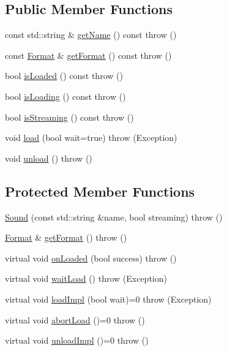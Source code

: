 \subsection*{Public Member Functions}
\begin{DoxyCompactItemize}
\item 
const std\+::string \& \hyperlink{classAudio_1_1Sound_abe908f4a8daa3bed34ae83d42b88995a}{get\+Name} () const   throw ()
\item 
const \hyperlink{structAudio_1_1Format}{Format} \& \hyperlink{classAudio_1_1Sound_a714c747a526cbbbd173d08e646761c4c}{get\+Format} () const   throw ()
\item 
bool \hyperlink{classAudio_1_1Sound_aedf1e75aa5941f03832b1311409f3207}{is\+Loaded} () const   throw ()
\item 
bool \hyperlink{classAudio_1_1Sound_af0eb3f71210b9edbc68dbb6dbd6c5ffa}{is\+Loading} () const   throw ()
\item 
bool \hyperlink{classAudio_1_1Sound_a1ab35988befedcd4946381f4fa34b4aa}{is\+Streaming} () const   throw ()
\item 
void \hyperlink{classAudio_1_1Sound_a916b66e6374afd61e5bef2963e8c6def}{load} (bool wait=true)  throw (\+Exception)
\item 
void \hyperlink{classAudio_1_1Sound_a949ed40b63466d4117766c2f7997a4cc}{unload} ()  throw ()
\end{DoxyCompactItemize}
\subsection*{Protected Member Functions}
\begin{DoxyCompactItemize}
\item 
\hyperlink{classAudio_1_1Sound_a8afa9a6f45a6bad39739b7c921e6ad3b}{Sound} (const std\+::string \&name, bool streaming)  throw ()
\item 
\hyperlink{structAudio_1_1Format}{Format} \& \hyperlink{classAudio_1_1Sound_a12781c8edb68b81c233940e8b1512bd1}{get\+Format} ()  throw ()
\item 
virtual void \hyperlink{classAudio_1_1Sound_ae6b55d6b14f5706c3f11fa70878b960e}{on\+Loaded} (bool success)  throw ()
\item 
virtual void \hyperlink{classAudio_1_1Sound_aa18c8b54b681491a6346d6df9405c752}{wait\+Load} ()  throw (\+Exception)
\item 
virtual void \hyperlink{classAudio_1_1Sound_a32acc8687f9c7f0741363c73fd8ff5e1}{load\+Impl} (bool wait)=0  throw (\+Exception)
\item 
virtual void \hyperlink{classAudio_1_1Sound_ae809e61eb0fe186ad9b0baf0dcb51759}{abort\+Load} ()=0  throw ()
\item 
virtual void \hyperlink{classAudio_1_1Sound_a01bd788703f9ac9855ed6e52045f344c}{unload\+Impl} ()=0  throw ()
\end{DoxyCompactItemize}
